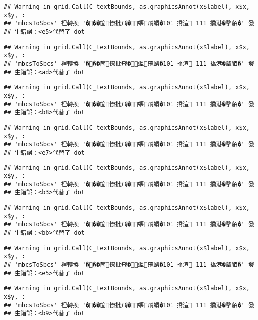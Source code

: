 \documentclass[
]{article}
\begin{document}
\begin{verbatim}
## Warning in grid.Call(C_textBounds, as.graphicsAnnot(x$label), x$x, x$y, :
## 'mbcsToSbcs' 裡轉換 '���箇憭批飛�蝘飛蝟�101 撟渲 111 撟港�摮貊�' 發
## 生錯誤：<e5>代替了 dot
\end{verbatim}

\begin{verbatim}
## Warning in grid.Call(C_textBounds, as.graphicsAnnot(x$label), x$x, x$y, :
## 'mbcsToSbcs' 裡轉換 '���箇憭批飛�蝘飛蝟�101 撟渲 111 撟港�摮貊�' 發
## 生錯誤：<ad>代替了 dot
\end{verbatim}

\begin{verbatim}
## Warning in grid.Call(C_textBounds, as.graphicsAnnot(x$label), x$x, x$y, :
## 'mbcsToSbcs' 裡轉換 '���箇憭批飛�蝘飛蝟�101 撟渲 111 撟港�摮貊�' 發
## 生錯誤：<b8>代替了 dot
\end{verbatim}

\begin{verbatim}
## Warning in grid.Call(C_textBounds, as.graphicsAnnot(x$label), x$x, x$y, :
## 'mbcsToSbcs' 裡轉換 '���箇憭批飛�蝘飛蝟�101 撟渲 111 撟港�摮貊�' 發
## 生錯誤：<e7>代替了 dot
\end{verbatim}

\begin{verbatim}
## Warning in grid.Call(C_textBounds, as.graphicsAnnot(x$label), x$x, x$y, :
## 'mbcsToSbcs' 裡轉換 '���箇憭批飛�蝘飛蝟�101 撟渲 111 撟港�摮貊�' 發
## 生錯誤：<b3>代替了 dot
\end{verbatim}

\begin{verbatim}
## Warning in grid.Call(C_textBounds, as.graphicsAnnot(x$label), x$x, x$y, :
## 'mbcsToSbcs' 裡轉換 '���箇憭批飛�蝘飛蝟�101 撟渲 111 撟港�摮貊�' 發
## 生錯誤：<bb>代替了 dot
\end{verbatim}

\begin{verbatim}
## Warning in grid.Call(C_textBounds, as.graphicsAnnot(x$label), x$x, x$y, :
## 'mbcsToSbcs' 裡轉換 '���箇憭批飛�蝘飛蝟�101 撟渲 111 撟港�摮貊�' 發
## 生錯誤：<e5>代替了 dot
\end{verbatim}

\begin{verbatim}
## Warning in grid.Call(C_textBounds, as.graphicsAnnot(x$label), x$x, x$y, :
## 'mbcsToSbcs' 裡轉換 '���箇憭批飛�蝘飛蝟�101 撟渲 111 撟港�摮貊�' 發
## 生錯誤：<b9>代替了 dot
\end{verbatim}
\end{document}
